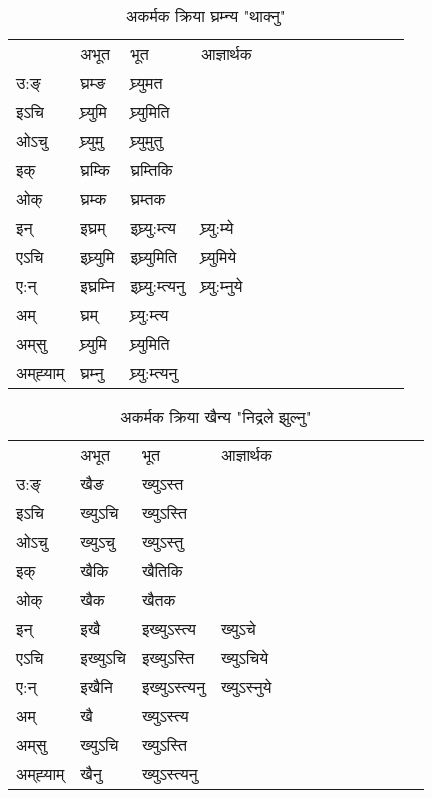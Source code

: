 \begin{table}[H]
\centering
\caption{\label{um.vi} अकर्मक क्रिया  घ्रम्‍न्य  "थाक्नु"  }
\begin{tabular}{l|l|l|l|l|l|l|l|l|l|l|l|l}  \toprule
&अभूत & भूत & आज्ञार्थक \\ 
उ:ङ्‌ &घ्रम्ङ &घ्र्युमत \\ 
इऽचि &घ्र्युमि &घ्र्युमिति   \\ 
ओऽचु &घ्र्युमु &घ्र्युमुतु   \\ 
इक् &घ्रम्कि &घ्रम्तिकि   \\ 
ओक् &घ्रम्क &घ्रम्तक   \\ 
इन् & इघ्रम् & इघ्र्यु:म्त्य &घ्र्यु:म्ये  \\ 
एऽचि & इघ्र्युमि & इघ्र्युमिति &घ्र्युमिये    \\ 
ए:न् & इघ्रम्‍नि  & इघ्र्यु:म्त्यनु &घ्र्यु:म्‍नुये  \\ 
अम् & घ्रम् & घ्र्यु:म्त्य   \\ 
अम्‌सु & घ्र्युमि & घ्र्युमिति   \\ 
अम्‌ह्‍याम् & घ्रम्‍नु  & घ्र्यु:म्त्यनु \\ 
\bottomrule
\end{tabular}
\end{table}


\begin{table}[H]
\centering
\caption{\label{un.vi} अकर्मक क्रिया  खैन्य  "निद्रले झुल्नु"  }
\begin{tabular}{l|l|l|l|l|l|l|l|l|l|l|l|l}  \toprule
&अभूत & भूत & आज्ञार्थक \\ 
उ:ङ्‌ &खैङ &ख्युऽस्त \\ 
इऽचि &ख्युऽचि &ख्युऽस्ति   \\ 
ओऽचु &ख्युऽचु &ख्युऽस्तु   \\ 
इक् &खैकि &खैतिकि   \\ 
ओक् &खैक &खैतक   \\ 
इन् & इखै & इख्युऽस्त्य &ख्युऽचे  \\ 
एऽचि & इख्युऽचि & इख्युऽस्ति &ख्युऽचिये    \\ 
ए:न् & इखैनि  & इख्युऽस्त्यनु &ख्युऽस्‍नुये  \\ 
अम् & खै & ख्युऽस्त्य   \\ 
अम्‌सु & ख्युऽचि & ख्युऽस्ति   \\ 
अम्‌ह्‍याम् & खैनु  & ख्युऽस्त्यनु \\ 
\bottomrule
\end{tabular}
\end{table}


